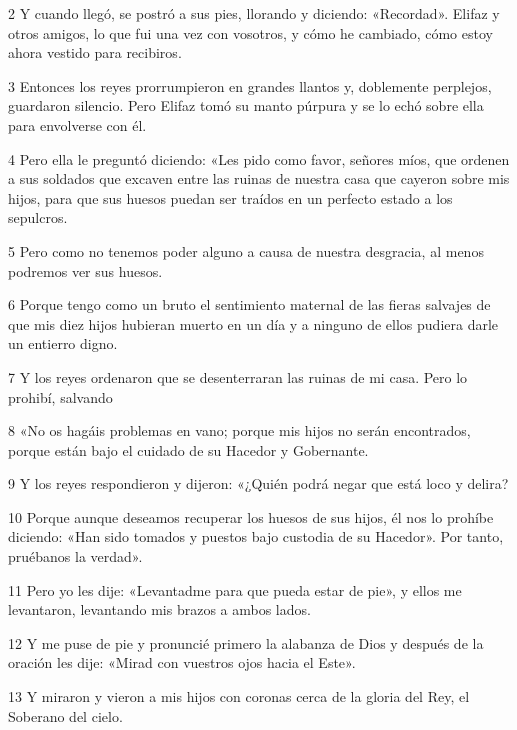 \par 2 Y cuando llegó, se postró a sus pies, llorando y diciendo: «Recordad». Elifaz y otros amigos, lo que fui una vez con vosotros, y cómo he cambiado, cómo estoy ahora vestido para recibiros.

\par 3 Entonces los reyes prorrumpieron en grandes llantos y, doblemente perplejos, guardaron silencio. Pero Elifaz tomó su manto púrpura y se lo echó sobre ella para envolverse con él.

\par 4 Pero ella le preguntó diciendo: «Les pido como favor, señores míos, que ordenen a sus soldados que excaven entre las ruinas de nuestra casa que cayeron sobre mis hijos, para que sus huesos puedan ser traídos en un perfecto estado a los sepulcros.

\par 5 Pero como no tenemos poder alguno a causa de nuestra desgracia, al menos podremos ver sus huesos.

\par 6 Porque tengo como un bruto el sentimiento maternal de las fieras salvajes de que mis diez hijos hubieran muerto en un día y a ninguno de ellos pudiera darle un entierro digno.

\par 7 Y los reyes ordenaron que se desenterraran las ruinas de mi casa. Pero lo prohibí, salvando

\par 8 «No os hagáis problemas en vano; porque mis hijos no serán encontrados, porque están bajo el cuidado de su Hacedor y Gobernante.

\par 9 Y los reyes respondieron y dijeron: «¿Quién podrá negar que está loco y delira?

\par 10 Porque aunque deseamos recuperar los huesos de sus hijos, él nos lo prohíbe diciendo: «Han sido tomados y puestos bajo custodia de su Hacedor». Por tanto, pruébanos la verdad».

\par 11 Pero yo les dije: «Levantadme para que pueda estar de pie», y ellos me levantaron, levantando mis brazos a ambos lados.

\par 12 Y me puse de pie y pronuncié primero la alabanza de Dios y después de la oración les dije: «Mirad con vuestros ojos hacia el Este».

\par 13 Y miraron y vieron a mis hijos con coronas cerca de la gloria del Rey, el Soberano del cielo.

